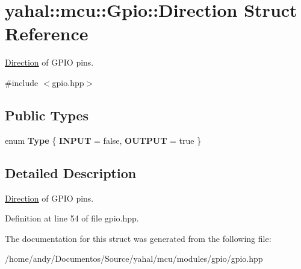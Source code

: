 \hypertarget{structyahal_1_1mcu_1_1_gpio_1_1_direction}{}\section{yahal\+:\+:mcu\+:\+:Gpio\+:\+:Direction Struct Reference}
\label{structyahal_1_1mcu_1_1_gpio_1_1_direction}


\hyperlink{structyahal_1_1mcu_1_1_gpio_1_1_direction}{Direction} of G\+P\+I\+O pins.  




{\ttfamily \#include $<$gpio.\+hpp$>$}

\subsection*{Public Types}
\begin{DoxyCompactItemize}
\item 
\hypertarget{structyahal_1_1mcu_1_1_gpio_1_1_direction_a439a47640b093599989104f4260ddea5}{}enum {\bfseries Type} \{ {\bfseries I\+N\+P\+U\+T} = false, 
{\bfseries O\+U\+T\+P\+U\+T} = true
 \}\label{structyahal_1_1mcu_1_1_gpio_1_1_direction_a439a47640b093599989104f4260ddea5}

\end{DoxyCompactItemize}


\subsection{Detailed Description}
\hyperlink{structyahal_1_1mcu_1_1_gpio_1_1_direction}{Direction} of G\+P\+I\+O pins. 

Definition at line 54 of file gpio.\+hpp.



The documentation for this struct was generated from the following file\+:\begin{DoxyCompactItemize}
\item 
/home/andy/\+Documentos/\+Source/yahal/mcu/modules/gpio/gpio.\+hpp\end{DoxyCompactItemize}
